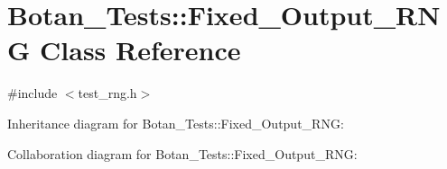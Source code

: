 \hypertarget{class_botan___tests_1_1_fixed___output___r_n_g}{}\section{Botan\+\_\+\+Tests\+:\+:Fixed\+\_\+\+Output\+\_\+\+R\+NG Class Reference}
\label{class_botan___tests_1_1_fixed___output___r_n_g}


{\ttfamily \#include $<$test\+\_\+rng.\+h$>$}



Inheritance diagram for Botan\+\_\+\+Tests\+:\+:Fixed\+\_\+\+Output\+\_\+\+R\+NG\+:


Collaboration diagram for Botan\+\_\+\+Tests\+:\+:Fixed\+\_\+\+Output\+\_\+\+R\+NG\+:
